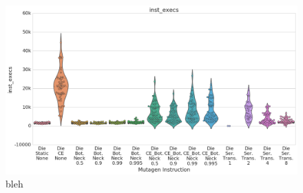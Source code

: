 \documentclass[PhD]{msu-thesis}
\begin{document}
\begin{appendices}
\begin{figure}[h!]
\begin{center}
\includegraphics[width=0.7\columnwidth]{figures/HGT/die_bottleneck.png}
\caption{bleh
}\label{fig:bottlenecks}
\end{center}
\end{figure}

\end{appendices}


\backmatter
\makebibliographypage
\SingleSpacing


\end{document}
